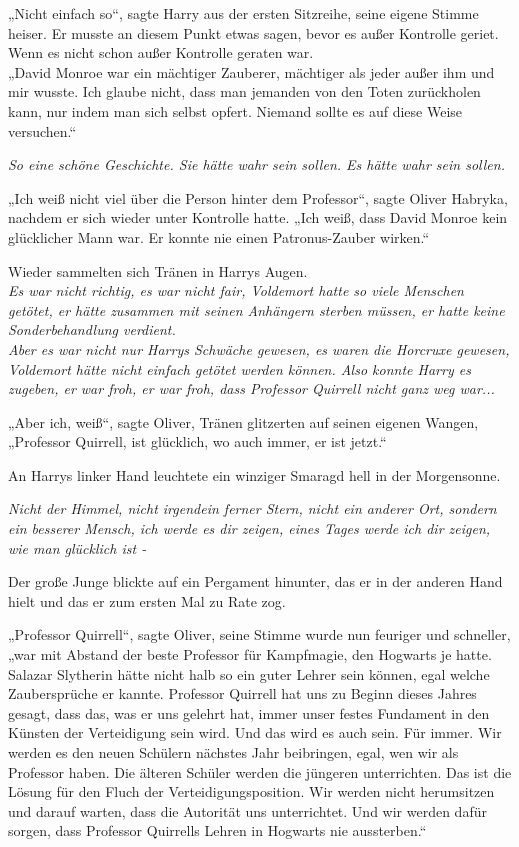 {„Nicht einfach so“, sagte Harry aus der ersten Sitzreihe, seine eigene Stimme heiser. Er musste an diesem Punkt etwas sagen, bevor es außer Kontrolle geriet. Wenn es nicht schon außer Kontrolle geraten war.\\ „David Monroe war ein mächtiger Zauberer, mächtiger als jeder außer ihm und mir wusste. Ich glaube nicht, dass man jemanden von den Toten zurückholen kann, nur indem man sich selbst opfert. Niemand sollte es auf diese Weise versuchen.“

\emph{So eine schöne Geschichte. Sie hätte wahr sein sollen. Es hätte wahr sein sollen.}

„Ich weiß nicht viel über die Person hinter dem Professor“, sagte Oliver Habryka, nachdem er sich wieder unter Kontrolle hatte. „Ich weiß, dass David Monroe kein glücklicher Mann war. Er konnte nie einen Patronus-Zauber wirken.“

Wieder sammelten sich Tränen in Harrys Augen.\\ \emph{Es war nicht richtig, es war nicht fair, Voldemort hatte so viele Menschen getötet, er hätte zusammen mit seinen Anhängern sterben müssen, er hatte keine Sonderbehandlung verdient.}\\ \emph{Aber es war nicht nur Harrys Schwäche gewesen, es waren die Horcruxe gewesen, Voldemort hätte nicht einfach getötet werden können. Also konnte Harry es zugeben, er war froh, er war froh, dass Professor Quirrell nicht ganz weg war...}

„Aber ich, weiß“, sagte Oliver, Tränen glitzerten auf seinen eigenen Wangen, „Professor Quirrell, ist glücklich, wo auch immer, er ist jetzt.“

An Harrys linker Hand leuchtete ein winziger Smaragd hell in der Morgensonne.

\emph{Nicht der Himmel, nicht irgendein ferner Stern, nicht ein anderer Ort, sondern ein besserer Mensch, ich werde es dir zeigen, eines Tages werde ich dir zeigen, wie man glücklich ist -}

Der große Junge blickte auf ein Pergament hinunter, das er in der anderen Hand hielt und das er zum ersten Mal zu Rate zog.

„Professor Quirrell“, sagte Oliver, seine Stimme wurde nun feuriger und schneller, „war mit Abstand der beste Professor für Kampfmagie, den Hogwarts je hatte. Salazar Slytherin hätte nicht halb so ein guter Lehrer sein können, egal welche Zaubersprüche er kannte. Professor Quirrell hat uns zu Beginn dieses Jahres gesagt, dass das, was er uns gelehrt hat, immer unser festes Fundament in den Künsten der Verteidigung sein wird. Und das wird es auch sein. Für immer. Wir werden es den neuen Schülern nächstes Jahr beibringen, egal, wen wir als Professor haben. Die älteren Schüler werden die jüngeren unterrichten. Das ist die Lösung für den Fluch der Verteidigungsposition. Wir werden nicht herumsitzen und darauf warten, dass die Autorität uns unterrichtet. Und wir werden dafür sorgen, dass Professor Quirrells Lehren in Hogwarts nie aussterben.“

}
